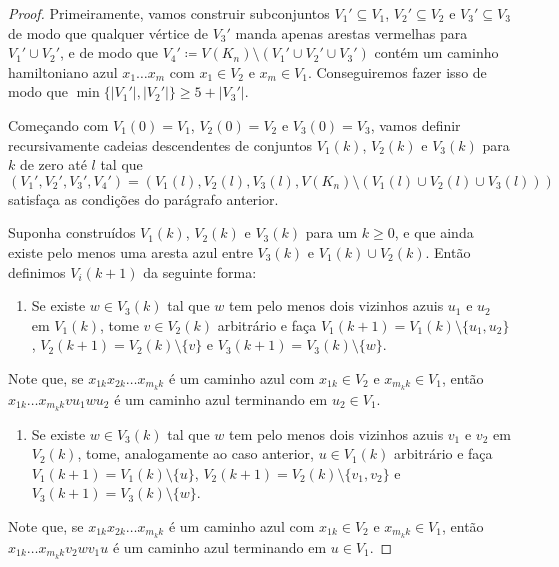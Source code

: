 \begin{proof}
	Primeiramente, vamos construir subconjuntos $V_1'\subseteq V_1$, $V_2'\subseteq V_2$ e $V_3'\subseteq V_3$ de modo que qualquer vértice de $V_3'$ manda apenas arestas vermelhas para $V_1'\cup V_2'$, e de modo que $V_4' \coloneqq V(K_n)\setminus (V_1'\cup V_2'\cup V_3')$ contém um caminho hamiltoniano azul $x_1\dots x_m$ com $x_1\in V_2$ e $x_m\in V_1$. Conseguiremos fazer isso de modo que $\min\{|V_1'|, |V_2'|\}\geq 5 + |V_3'|$.
	
	Começando com $V_1(0) = V_1$, $V_2(0) = V_2$ e $V_3(0) = V_3$, vamos definir recursivamente cadeias descendentes de conjuntos $V_1(k)$, $V_2(k)$ e $V_3(k)$ para $k$ de zero até $l$ tal que $(V_1', V_2', V_3', V_4') = (V_1(l), V_2(l), V_3(l), V(K_n)\setminus (V_1(l)\cup V_2(l)\cup V_3(l)))$ satisfaça as condições do parágrafo anterior.
	
	Suponha construídos $V_1(k)$, $V_2(k)$ e $V_3(k)$ para um $k\geq0$, e que ainda existe pelo menos uma aresta azul entre $V_3(k)$ e $V_1(k)\cup V_2(k)$. Então definimos $V_i(k+1)$ da seguinte forma:
	\begin{enumerate}
		\item \label{item:dois_vizinhos_azuis}Se existe $w\in V_3(k)$ tal que $w$ tem pelo menos dois vizinhos azuis $u_1$ e $u_2$ em $V_1(k)$, tome $v\in V_2(k)$ arbitrário e faça $V_1(k+1) = V_1(k)\setminus\{u_1, u_2\}$, $V_2(k+1) = V_2(k)\setminus\{v\}$ e $V_3(k+1) = V_3(k)\setminus\{w\}$.
	\end{enumerate}
	Note que, se $x_{1k}x_{2k}\dots x_{m_kk}$ é um caminho azul com $x_{1k}\in V_2$ e $x_{m_kk}\in V_1$, então $x_{1k}\dots x_{m_kk}vu_1wu_2$ é um caminho azul terminando em $u_2\in V_1$.
	\begin{enumerate}
		\item Se existe $w\in V_3(k)$ tal que $w$ tem pelo menos dois vizinhos azuis $v_1$ e $v_2$ em $V_2(k)$, tome, analogamente ao caso anterior, $u\in V_1(k)$ arbitrário e faça $V_1(k+1) = V_1(k)\setminus\{u\}$, $V_2(k+1) = V_2(k)\setminus\{v_1,v_2\}$ e $V_3(k+1) = V_3(k)\setminus\{w\}$.
	\end{enumerate}
	Note que, se $x_{1k}x_{2k}\dots x_{m_kk}$ é um caminho azul com $x_{1k}\in V_2$ e $x_{m_kk}\in V_1$, então $x_{1k}\dots x_{m_kk}v_2wv_1u$ é um caminho azul terminando em $u\in V_1$.
	

\end{proof}
